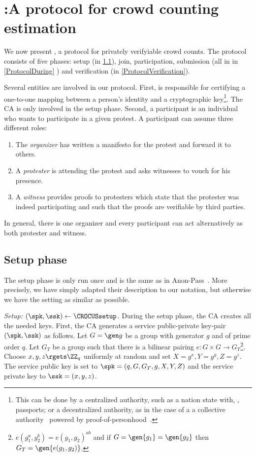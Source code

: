 \section{\CROCUS:\@ A protocol for crowd counting estimation}%
\label{Protocol}


We now present \CROCUS, a protocol for privately verifyiable crowd counts.
The protocol consists of five phases: setup (in \cref{ProtocolSetup}),
join, participation, submission (all in in \cref{ProtocolDuring} ) and
verification (in \cref{ProtocolVerification}).

Several entities are involved in our protocol.
First,  is responsible for certifying a one-to-one mapping between a 
person's identity and a cryptographic key\footnote{%
  This can be done by a centralized authority, such as a nation state with, 
  \eg, passports; or a decentralized authority, as in the case of a a 
  collective authority~\cite{collective-signing} powered by 
  proof-of-personhood~\cite{proof-of-personhood}.
}.
The \ac{CA} is only involved in the setup phase.
Second, a participant is an individual who wants to participate in a given 
protest.
A participant can assume three different roles:
\begin{enumerate}
\item The \emph{organizer} has written a manifesto for the protest and forward it to others.
\item A \emph{protester} is attending the protest and asks witnesses to vouch 
  for his presence.
\item A \emph{witness} provides proofs to protesters which state that the 
  protester was indeed participating and such that the proofs are verifiable by 
  third parties.
\end{enumerate}
In general, there is one organizer and every participant can act alternatively 
as both protester and witness.

\subsection{Setup phase}%
\label{ProtocolSetup}

The setup phase is only run once and is the same as in Anon-Pass~\cite{AnonPass}.
More precisely, we have simply adapted their description to our notation, but otherwise we have the setting as similar as possible.


\emph{Setup: \((\spk, \ssk)\gets \CROCUSsetup\).}
During the setup phase, the \ac{CA} creates all the needed keys.
First, the \ac{CA} generates a service public-private key-pair \((\spk, \ssk)\) as follows.
Let \(G = \gen g\) be a group with generator \(g\) and of prime order \(q\).
Let \(G_T\) be a group such that there is a bilinear pairing \(e\colon G\times G\to G_T\)\footnote{%
  \Ie \(e(g_1^a, g_2^b) = e(g_1, g_2)^{ab}\) and if \(G = \gen{g_1} = 
    \gen{g_2}\) then \(G_T = \gen{e(g_1, g_2)}\).
}.
Choose \(x,y,z\rgets \ZZ_q\) uniformly at random and set \(X = g^x, Y = g^y, Z = g^z\).
The service public key is set to \(\spk = (q, G, G_T, g, X, Y, Z)\) and the service private key to \(\ssk = (x, y, z)\).


